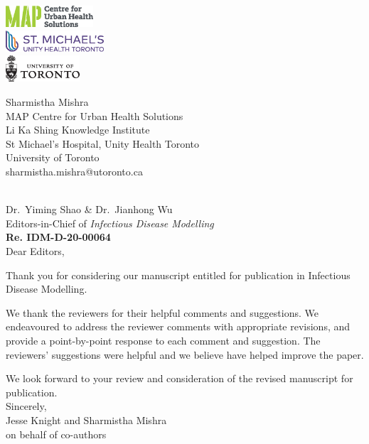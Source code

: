 \documentclass{article}
\begin{document}
\begin{minipage}{0.5\linewidth}
  \includegraphics[height=0.8cm]{map-cuhs.eps}\\[1ex]
  \includegraphics[height=0.8cm]{smh.eps}     \\[1ex]
  \includegraphics[height=1.0cm]{uoft.eps}
\end{minipage}%
\begin{minipage}{0.5\linewidth}
  \begin{flushright}\small
    Sharmistha Mishra\\
    MAP Centre for Urban Health Solutions\\
    Li Ka Shing Knowledge Institute\\
    St Michael's Hospital,
    Unity Health Toronto\\
    University of Toronto\\
    sharmistha.mishra@utoronto.ca
  \end{flushright}
\end{minipage}
\\[3ex]
Dr.\ Yiming Shao \& Dr.\ Jianhong Wu\\
Editors-in-Chief of \textit{Infectious Disease Modelling}\\[2ex]
\textbf{Re. IDM-D-20-00064}\\[1em]
Dear Editors,
\par
Thank you for considering our manuscript entitled
\emph{\unskip} for publication in Infectious Disease Modelling.
\par
We thank the reviewers for their helpful comments and suggestions.
We endeavoured to address the reviewer comments with appropriate revisions, and 
provide a point-by-point response to each comment and suggestion.
The reviewers' suggestions were helpful and we believe have helped improve the paper.

\par
We look forward to your review and consideration of the revised
manuscript for publication.
\\[2em]
Sincerely,\\[1em]
Jesse Knight and Sharmistha Mishra\\
on behalf of co-authors
\clearpage

\end{document}
